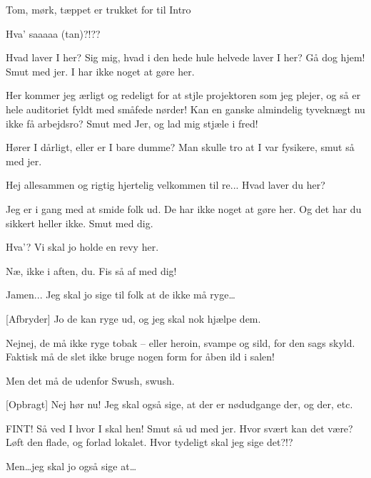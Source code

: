 \documentclass[a4paper]{article}
\begin{document}
\begin{sketch}
  
  \scene Tom, mørk, tæppet er trukket for til Intro
  
   Hva' saaaaa
  (tan)?!??
  
  Hvad laver I her? Sig mig, hvad i den hede hule helvede laver I her?
  Gå dog hjem! Smut med jer. I har ikke noget at gøre her.

  Her kommer jeg ærligt og redeligt for at stjle projektoren som jeg plejer,
  og så er hele auditoriet fyldt med småfede nørder! Kan en ganske almindelig 
  tyveknægt nu ikke få arbejdsro? Smut med Jer, og lad mig stjæle i fred!
  
   Hører
  I dårligt, eller er I bare dumme? Man skulle tro at I var fysikere,
  smut så med jer.
  
   Hej allesammen og rigtig
  hjertelig velkommen til re...  Hvad
  laver du her?
  
   Jeg er i gang med at smide folk ud. De har ikke noget at
  gøre her. Og det har du sikkert heller
  ikke. Smut med dig.
  
   Hva'? Vi skal jo holde en revy her.
  
   Næ, ikke i aften, du. Fis så af med dig!
  
   Jamen... Jeg skal jo sige til folk at de ikke må ryge\ldots

  [Afbryder] Jo de kan ryge ud, og jeg skal nok hjælpe dem.
 
   Nejnej, de må ikke ryge tobak -- eller heroin, svampe og sild, for
  den sags skyld. Faktisk må de slet ikke bruge nogen form for åben ild i
  salen!
  
   Men det må de udenfor  Swush, swush.
  
  [Opbragt] Nej hør nu! Jeg skal også sige, at der er nødudgange der,
  og der, etc.
  
   FINT! Så ved I hvor I skal hen! Smut så ud med jer. Hvor
  svært kan det være? Løft den flade, og forlad
  lokalet. Hvor tydeligt skal jeg sige det?!?
  
   Men\ldots jeg skal jo også sige at\ldots
  

\end{sketch}
\end{document}
